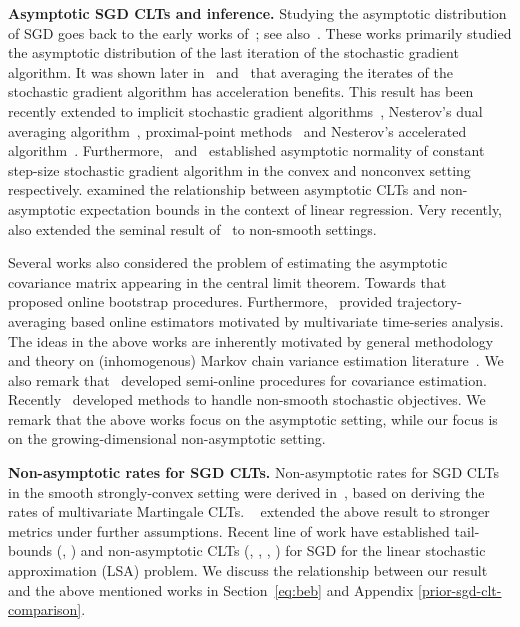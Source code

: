 \documentclass[11pt, reqno,english]{amsart}
\begin{document}
\textbf{Asymptotic SGD CLTs and inference.} Studying the asymptotic distribution of SGD goes back to the early works of~\cite{chung1954stochastic, sacks1958asymptotic, fabian1968asymptotic}; see also~\cite{shapiro1989asymptotic}. These works primarily studied the asymptotic distribution of the last iteration of the stochastic gradient algorithm. It was shown later in~\cite{ruppert1988efficient} and~\cite{polyak1992acceleration} that averaging the iterates of the stochastic gradient algorithm has acceleration benefits. This result has been recently extended to implicit stochastic gradient algorithms~\cite{toulis2017asymptotic}, Nesterov's dual averaging algorithm~\cite{duchi2016local}, proximal-point methods~\cite{asi2019stochastic} and Nesterov's accelerated algorithm~\cite{barakat2021stochastic}.  Furthermore,~\cite{dieuleveut2020bridging} and~\cite{yu2020analysis} established asymptotic normality of constant step-size stochastic gradient algorithm in the convex and nonconvex setting respectively. \cite{mou2020linear} examined the relationship between asymptotic CLTs and non-asymptotic expectation bounds in the context of linear regression. Very recently,~\cite{davis2023asymptotic} also extended the seminal result of~\cite{polyak1992acceleration} to non-smooth settings. 

Several works also considered the problem of estimating the asymptotic covariance matrix appearing in the central limit theorem. Towards that~\cite{su2018statistical, fang2018online, lunde2021bootstrapping, chee2022plus} proposed online bootstrap procedures. Furthermore,~\cite{zhu2021online,jin2021statistical} provided trajectory-averaging based online estimators motivated by multivariate time-series analysis. The ideas in the above works are inherently motivated by general methodology and theory on (inhomogenous) Markov chain variance estimation literature~\cite{glynn1991estimating,politis1999subsampling, flegal2010batch, kim2013progressive,lahiri2013resampling}. We also remark that~\cite{li2018approximate, li2018statistical,chen2016statistical,lee2022fast} developed semi-online procedures for covariance estimation. Recently~\cite{jiang2025online} developed methods to handle non-smooth stochastic objectives. We remark that the above works focus on the asymptotic setting, while our focus is on the growing-dimensional non-asymptotic setting.

\textbf{Non-asymptotic rates for SGD CLTs.}
Non-asymptotic rates for SGD CLTs in the smooth strongly-convex setting were derived  in~\cite{anastasiou2019normal}, based on deriving the rates of multivariate Martingale CLTs. ~\cite{shao2022berry} extended the above result to stronger metrics under further assumptions. Recent line of work have established tail-bounds (\cite{durmus2022finite}, \cite{durmus2021tight}) and non-asymptotic CLTs (\cite{samsonov2024gaussian}, \cite{Khusainov2025GaussianApprox}, \cite{WuLiWeiRinaldo2025InferenceTD}, \cite{Samsonov2025StatisticalInferenceLSA}) for SGD for the linear stochastic approximation (LSA) problem. We discuss the relationship between our result and the above mentioned works in Section~\ref{eq:beb} and Appendix \ref{prior-sgd-clt-comparison}.
\end{document}
